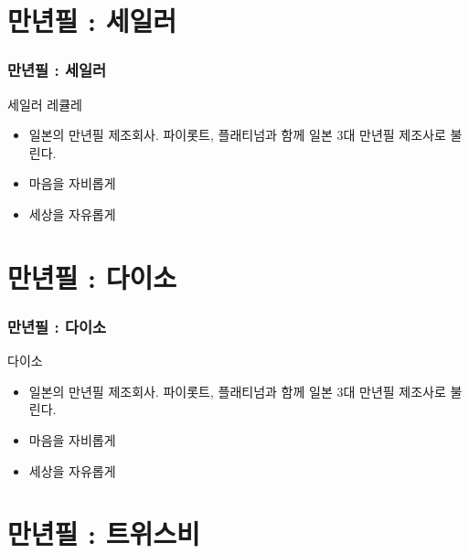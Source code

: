 \documentclass[aspectratio=1610,20pt,xcolor=pdftex,dvipsnames,table,handout]{beamer}
\begin{document}
		\section{만년필 : 세일러 }

		\begin{frame} [t,plain]
		\frametitle{만년필 : 세일러 }

			\begin{block} {세일러 레큘레}
			\setlength{\leftmargini}{2em}			
			\begin{itemize}
				\item 일본의 만년필 제조회사. 파이롯트, 플래티넘과 함께 일본 3대 만년필 제조사로 불린다.
				\item 마음을 자비롭게
				\item 세상을 자유롭게
			\end{itemize}
			\end{block}						

		\end{frame}						


		\section{만년필 : 다이소 }

		\begin{frame} [t,plain]
		\frametitle{만년필 : 다이소 }

			\begin{block} {다이소}
			\setlength{\leftmargini}{2em}			
			\begin{itemize}
				\item 일본의 만년필 제조회사. 파이롯트, 플래티넘과 함께 일본 3대 만년필 제조사로 불린다.
				\item 마음을 자비롭게
				\item 세상을 자유롭게
			\end{itemize}
			\end{block}						

		\end{frame}						

		\section{만년필 : 트위스비 }
\end{document}
